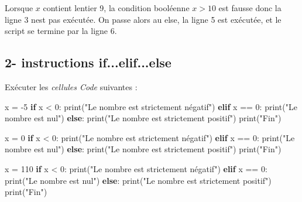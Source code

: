 \documentclass[
  paper=a4,
  ,captions=tableheading
]{scrartcl}
\newenvironment{Shaded}{}{}
\newcommand{\BuiltInTok}[1]{\textcolor[rgb]{0.00,0.50,0.00}{#1}}
\newcommand{\ControlFlowTok}[1]{\textcolor[rgb]{0.00,0.44,0.13}{\textbf{#1}}}
\newcommand{\DecValTok}[1]{\textcolor[rgb]{0.25,0.63,0.44}{#1}}
\newcommand{\NormalTok}[1]{#1}
\newcommand{\OperatorTok}[1]{\textcolor[rgb]{0.40,0.40,0.40}{#1}}
\newcommand{\StringTok}[1]{\textcolor[rgb]{0.25,0.44,0.63}{#1}}
\begin{document}
Lorsque \(x\) contient l\textquotesingle entier 9, la condition
booléenne \(x>10\) est fausse donc la ligne 3 n\textquotesingle est pas
exécutée. On passe alors au else, la ligne 5 est exécutée, et le script
se termine par la ligne 6.

\hypertarget{2--instructions-ifelifelse}{%
\subsection{2- instructions
if...elif...else}\label{2--instructions-ifelifelse}}

Exécuter les \emph{cellules Code} suivantes :

\begin{Shaded}
\begin{Highlighting}[]
\NormalTok{x }\OperatorTok{=} \OperatorTok{{-}}\DecValTok{5}
\ControlFlowTok{if}\NormalTok{ x }\OperatorTok{\textless{}} \DecValTok{0}\NormalTok{:}
    \BuiltInTok{print}\NormalTok{(}\StringTok{"Le nombre est strictement négatif"}\NormalTok{)}
\ControlFlowTok{elif}\NormalTok{ x }\OperatorTok{==} \DecValTok{0}\NormalTok{:}
    \BuiltInTok{print}\NormalTok{(}\StringTok{"Le nombre est nul"}\NormalTok{)}
\ControlFlowTok{else}\NormalTok{:}
    \BuiltInTok{print}\NormalTok{(}\StringTok{"Le nombre est strictement positif"}\NormalTok{)}
\BuiltInTok{print}\NormalTok{(}\StringTok{"Fin"}\NormalTok{)}
\end{Highlighting}
\end{Shaded}

\begin{Shaded}
\begin{Highlighting}[]
\NormalTok{x }\OperatorTok{=} \DecValTok{0}
\ControlFlowTok{if}\NormalTok{ x }\OperatorTok{\textless{}} \DecValTok{0}\NormalTok{:}
    \BuiltInTok{print}\NormalTok{(}\StringTok{"Le nombre est strictement négatif"}\NormalTok{)}
\ControlFlowTok{elif}\NormalTok{ x }\OperatorTok{==} \DecValTok{0}\NormalTok{:}
    \BuiltInTok{print}\NormalTok{(}\StringTok{"Le nombre est nul"}\NormalTok{)}
\ControlFlowTok{else}\NormalTok{:}
    \BuiltInTok{print}\NormalTok{(}\StringTok{"Le nombre est strictement positif"}\NormalTok{)}
\BuiltInTok{print}\NormalTok{(}\StringTok{"Fin"}\NormalTok{)}
\end{Highlighting}
\end{Shaded}

\begin{Shaded}
\begin{Highlighting}[]
\NormalTok{x }\OperatorTok{=} \DecValTok{110}
\ControlFlowTok{if}\NormalTok{ x }\OperatorTok{\textless{}} \DecValTok{0}\NormalTok{:}
    \BuiltInTok{print}\NormalTok{(}\StringTok{"Le nombre est strictement négatif"}\NormalTok{)}
\ControlFlowTok{elif}\NormalTok{ x }\OperatorTok{==} \DecValTok{0}\NormalTok{:}
    \BuiltInTok{print}\NormalTok{(}\StringTok{"Le nombre est nul"}\NormalTok{)}
\ControlFlowTok{else}\NormalTok{:}
    \BuiltInTok{print}\NormalTok{(}\StringTok{"Le nombre est strictement positif"}\NormalTok{)}
\BuiltInTok{print}\NormalTok{(}\StringTok{"Fin"}\NormalTok{)}
\end{Highlighting}
\end{Shaded}
\end{document}
